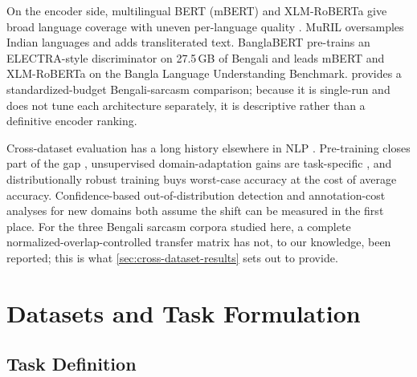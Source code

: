 \documentclass{ieeeaccess}
\begin{document}
On the encoder side, multilingual BERT (mBERT) \cite{devlin2019bert,pires2019multilingual} and XLM-RoBERTa \cite{conneau2020xlmr} give broad language coverage with uneven per-language quality \cite{wu2020alllanguages,lauscher2020zero}. MuRIL \cite{khanuja2021muril} oversamples Indian languages and adds transliterated text. BanglaBERT \cite{bhattacharjee2022banglabert} pre-trains an ELECTRA-style discriminator on 27.5\,GB of Bengali and leads mBERT and XLM-RoBERTa on the Bangla Language Understanding Benchmark.  provides a standardized-budget Bengali-sarcasm comparison; because it is single-run and does not tune each architecture separately, it is descriptive rather than a definitive encoder ranking.

Cross-dataset evaluation has a long history elsewhere in NLP \cite{plank2016multilingual,elsahar2019annotate}. Pre-training closes part of the gap \cite{hendrycks2020pretrained}, unsupervised domain-adaptation gains are task-specific \cite{ramponi2020neural}, and distributionally robust training \cite{oren2019distributionally} buys worst-case accuracy at the cost of average accuracy. Confidence-based out-of-distribution detection \cite{hendrycks2017baseline} and annotation-cost analyses for new domains \cite{elsahar2019annotate} both assume the shift can be measured in the first place. For the three Bengali sarcasm corpora studied here, a complete normalized-overlap-controlled transfer matrix has not, to our knowledge, been reported; this is what \cref{sec:cross-dataset-results} sets out to provide.

\section{Datasets and Task Formulation}
\label{sec:datasets}

\subsection{Task Definition}
\label{sec:task-def}
\end{document}
